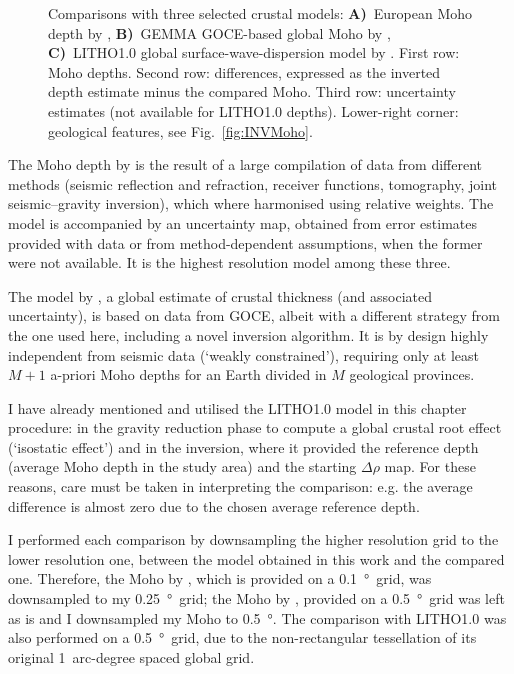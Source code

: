 \begin{figure}
	\begin{adjustbox}{center}
	\end{adjustbox}
	\caption[Comparisons of inverted Moho with three selected crustal models.]{Comparisons with three selected crustal models: \textbf{A)}~European Moho depth by \textcite{Grad2009}, \textbf{B)}~GEMMA GOCE-based global Moho by \textcite{Reguzzoni2015}, \textbf{C)}~{LITHO1.0} global surface-wave-dispersion model by \textcite{Pasyanos2014}.
	First row: Moho depths. Second row: differences, expressed as the inverted depth estimate minus the compared Moho. Third row: uncertainty estimates (not available for {LITHO1.0} depths).
	Lower-right corner: geological features, see Fig.~\ref{fig:INVMoho}.}
	\label{fig:MohoComparisons}
\end{figure}

The Moho depth by \textcite{Grad2009} is the result of a large compilation of data from different methods (seismic reflection and refraction, receiver functions, tomography, joint seismic--gravity inversion), which where harmonised using relative weights.
The model is accompanied by an uncertainty map, obtained from error estimates provided with data or from method-dependent assumptions, when the former were not available.
It is the highest resolution model among these three.

The model by \textcite{Reguzzoni2015}, a global estimate of crustal thickness (and associated uncertainty), is based on data from GOCE, albeit with a different strategy from the one used here, including a novel inversion algorithm.
It is by design highly independent from seismic data (`weakly constrained'), requiring only at least $M+1$ a-priori Moho depths for an Earth divided in $M$ geological provinces.

I have already mentioned and utilised the {LITHO1.0} \parencite{Pasyanos2014} model in this chapter procedure: in the gravity reduction phase to compute a global crustal root effect (`isostatic effect') and in the inversion, where it provided the reference depth (average Moho depth in the study area) and the starting $\Delta \rho$ map.
For these reasons, care must be taken in interpreting the comparison: e.g. the average difference is almost zero due to the chosen average reference depth.

I performed each comparison by downsampling the higher resolution grid to the lower resolution one, between the model obtained in this work and the compared one.
Therefore, the Moho by \textcite{Grad2009}, which is provided on a \SI{0.1}{\degree}~grid, was downsampled to my \SI{0.25}{\degree}~grid; the Moho by \textcite{Reguzzoni2015}, provided on a \SI{0.5}{\degree}~grid was left as is and I downsampled my Moho to \SI{0.5}{\degree}.
The comparison with LITHO1.0 was also performed on a \SI{0.5}{\degree}~grid, due to the non-rectangular tessellation of its original \num{1}~arc-degree spaced global grid.

